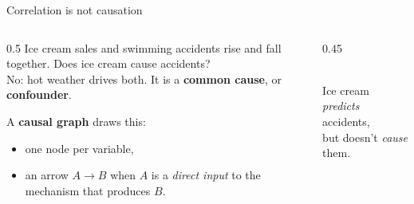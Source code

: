 \documentclass[aspectratio=169,11pt,xcolor={table}]{beamer}
\newcommand{\aside}[1]{{\color{muted}\small #1}}
\begin{document}
\begin{frame}{Correlation is not causation}
  \begin{columns}[c]
    \begin{column}{0.5\textwidth}
      Ice cream sales and swimming accidents rise and fall together.
      Does ice cream cause accidents?\\[2mm]
      No: hot weather drives both. It is a \textbf{common cause}, or \textbf{confounder}.
      \bigskip

      A \textbf{causal graph} draws this:
      \begin{itemize}
        \item one node per variable,
        \item an arrow $A \to B$ when $A$ is a \emph{direct input} to the mechanism that produces $B$.
      \end{itemize}
    \end{column}
    \begin{column}{0.45\textwidth}
      \centering
      \\[2mm]
      \aside{Ice cream \emph{predicts} accidents,\\but doesn't \emph{cause} them.}
    \end{column}
  \end{columns}
\end{frame}
\end{document}
